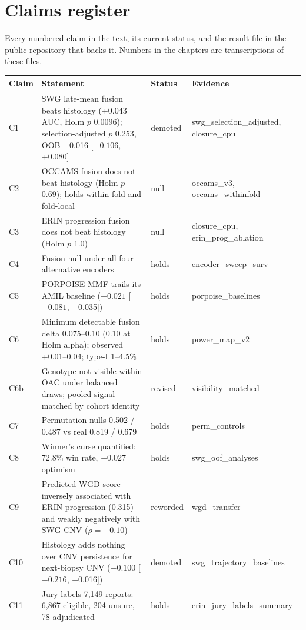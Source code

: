 \chapter{Claims register}
\label{app:claims}

Every numbered claim in the text, its current status, and the result file in the public repository that backs it. Numbers in the chapters are transcriptions of these files.

\begin{small}
\begin{longtable}{@{}p{0.9cm}p{8.6cm}p{2.2cm}p{3.3cm}@{}}
\toprule
Claim & Statement & Status & Evidence \\
\midrule
\endhead
C1 & SWG late-mean fusion beats histology (+0.043 AUC, Holm $p$ 0.0096); selection-adjusted $p$ 0.253, OOB +0.016 [$-0.106$, +0.080] & demoted & swg\_selection\_adjusted, closure\_cpu \\
C2 & OCCAMS fusion does not beat histology (Holm $p$ 0.69); holds within-fold and fold-local & null & occams\_v3, occams\_withinfold \\
C3 & ERIN progression fusion does not beat histology (Holm $p$ 1.0) & null & closure\_cpu, erin\_prog\_ablation \\
C4 & Fusion null under all four alternative encoders & holds & encoder\_sweep\_surv \\
C5 & PORPOISE MMF trails its AMIL baseline ($-0.021$ [$-0.081$, +0.035]) & holds & porpoise\_baselines \\
C6 & Minimum detectable fusion delta 0.075--0.10 (0.10 at Holm alpha); observed +0.01--0.04; type-I 1--4.5\% & holds & power\_map\_v2 \\
C6b & Genotype not visible within OAC under balanced draws; pooled signal matched by cohort identity & revised & visibility\_matched \\
C7 & Permutation nulls 0.502 / 0.487 vs real 0.819 / 0.679 & holds & perm\_controls \\
C8 & Winner's curse quantified: 72.8\% win rate, +0.027 optimism & holds & swg\_oof\_analyses \\
C9 & Predicted-WGD score inversely associated with ERIN progression (0.315) and weakly negatively with SWG CNV ($\rho=-0.10$) & reworded & wgd\_transfer \\
C10 & Histology adds nothing over CNV persistence for next-biopsy CNV ($-0.100$ [$-0.216$, +0.016]) & demoted & swg\_trajectory\_baselines \\
C11 & Jury labels 7,149 reports: 6,867 eligible, 204 unsure, 78 adjudicated & holds & erin\_jury\_labels\_summary \\

\end{longtable}
\end{small}
